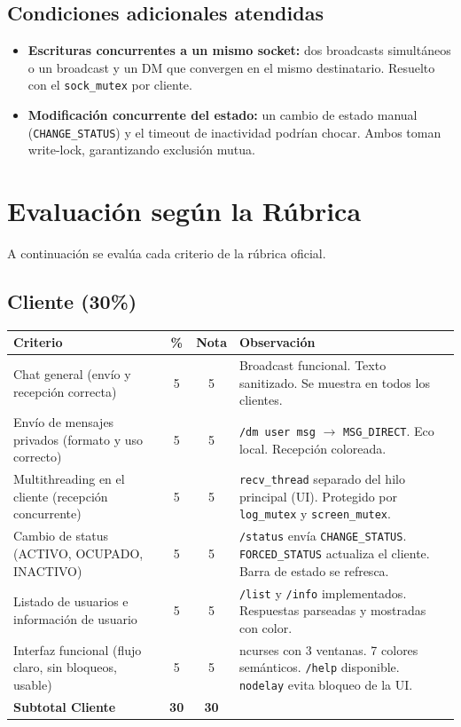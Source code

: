 \documentclass[12pt,a4paper]{article}
\begin{document}
\subsection{Condiciones adicionales atendidas}

\begin{itemize}
    \item \textbf{Escrituras concurrentes a un mismo socket:} dos broadcasts
          simultáneos o un broadcast y un DM que convergen en el mismo
          destinatario.  Resuelto con el \texttt{sock\_mutex} por cliente.
    \item \textbf{Modificación concurrente del estado:} un cambio de estado manual
          (\texttt{CHANGE\_STATUS}) y el timeout de inactividad podrían chocar.
          Ambos toman write-lock, garantizando exclusión mutua.
\end{itemize}

\section{Evaluación según la Rúbrica}
\label{sec:rubrica}

A continuación se evalúa cada criterio de la rúbrica oficial.

\subsection{Cliente (30\%)}

\begin{longtable}{p{7.5cm}ccp{4cm}}
\toprule
\textbf{Criterio} & \textbf{\%} & \textbf{Nota} & \textbf{Observación} \\
\midrule
\endhead
Chat general (envío y recepción correcta) & 5 & 5 &
    Broadcast funcional.  Texto sanitizado.  Se muestra en todos los clientes. \\
\midrule
Envío de mensajes privados (formato y uso correcto) & 5 & 5 &
    \texttt{/dm user msg} $\to$ \texttt{MSG\_DIRECT}.  Eco local.  Recepción coloreada. \\
\midrule
Multithreading en el cliente (recepción concurrente) & 5 & 5 &
    \texttt{recv\_thread} separado del hilo principal (UI).  Protegido por
    \texttt{log\_mutex} y \texttt{screen\_mutex}. \\
\midrule
Cambio de status (ACTIVO, OCUPADO, INACTIVO) & 5 & 5 &
    \texttt{/status} envía \texttt{CHANGE\_STATUS}.  \texttt{FORCED\_STATUS}
    actualiza el cliente.  Barra de estado se refresca. \\
\midrule
Listado de usuarios e información de usuario & 5 & 5 &
    \texttt{/list} y \texttt{/info} implementados.  Respuestas parseadas y
    mostradas con color. \\
\midrule
Interfaz funcional (flujo claro, sin bloqueos, usable) & 5 & 5 &
    ncurses con 3 ventanas.  7 colores semánticos.  \texttt{/help} disponible.
    \texttt{nodelay} evita bloqueo de la UI. \\
\midrule
\textbf{Subtotal Cliente} & \textbf{30} & \textbf{30} & \\
\bottomrule
\end{longtable}
\end{document}

